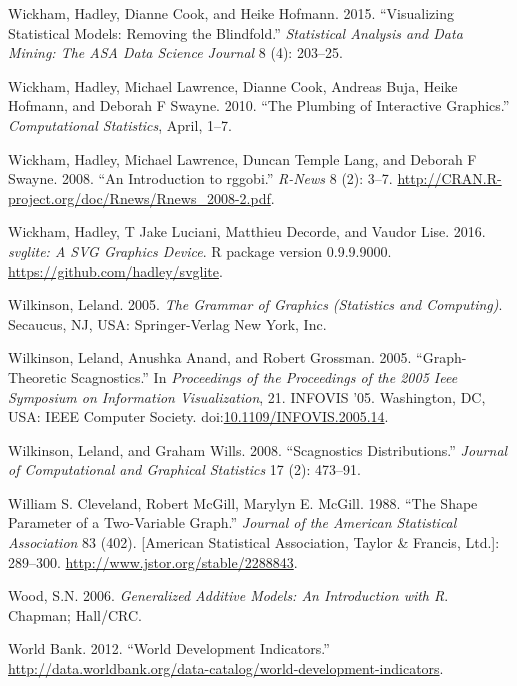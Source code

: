 \documentclass[12pt,]{isuthesis}
\begin{document}
\hypertarget{ref-model-vis-paper}{}
Wickham, Hadley, Dianne Cook, and Heike Hofmann. 2015. ``Visualizing
Statistical Models: Removing the Blindfold.'' \emph{Statistical Analysis
and Data Mining: The ASA Data Science Journal} 8 (4): 203--25.

\hypertarget{ref-plumbing}{}
Wickham, Hadley, Michael Lawrence, Dianne Cook, Andreas Buja, Heike
Hofmann, and Deborah F Swayne. 2010. ``The Plumbing of Interactive
Graphics.'' \emph{Computational Statistics}, April, 1--7.

\hypertarget{ref-rggobi}{}
Wickham, Hadley, Michael Lawrence, Duncan Temple Lang, and Deborah F
Swayne. 2008. ``An Introduction to rggobi.'' \emph{R-News} 8 (2): 3--7.
\url{http://CRAN.R-project.org/doc/Rnews/Rnews_2008-2.pdf}.

\hypertarget{ref-svglite}{}
Wickham, Hadley, T Jake Luciani, Matthieu Decorde, and Vaudor Lise.
2016. \emph{svglite: A SVG Graphics Device}. R package version
0.9.9.9000. \url{https://github.com/hadley/svglite}.

\hypertarget{ref-Wilkinson:2005}{}
Wilkinson, Leland. 2005. \emph{The Grammar of Graphics (Statistics and
Computing)}. Secaucus, NJ, USA: Springer-Verlag New York, Inc.

\hypertarget{ref-Wilkinson:2005b}{}
Wilkinson, Leland, Anushka Anand, and Robert Grossman. 2005.
``Graph-Theoretic Scagnostics.'' In \emph{Proceedings of the Proceedings
of the 2005 Ieee Symposium on Information Visualization}, 21. INFOVIS
'05. Washington, DC, USA: IEEE Computer Society.
doi:\href{https://doi.org/10.1109/INFOVIS.2005.14}{10.1109/INFOVIS.2005.14}.

\hypertarget{ref-Wilkinson:2008}{}
Wilkinson, Leland, and Graham Wills. 2008. ``Scagnostics
Distributions.'' \emph{Journal of Computational and Graphical
Statistics} 17 (2): 473--91.

\hypertarget{ref-banking}{}
William S. Cleveland, Robert McGill, Marylyn E. McGill. 1988. ``The
Shape Parameter of a Two-Variable Graph.'' \emph{Journal of the American
Statistical Association} 83 (402). {[}American Statistical Association,
Taylor \& Francis, Ltd.{]}: 289--300.
\url{http://www.jstor.org/stable/2288843}.

\hypertarget{ref-mgcv}{}
Wood, S.N. 2006. \emph{Generalized Additive Models: An Introduction with
R}. Chapman; Hall/CRC.

\hypertarget{ref-WorldBank}{}
World Bank. 2012. ``World Development Indicators.''
\url{http://data.worldbank.org/data-catalog/world-development-indicators}.
\end{document}
